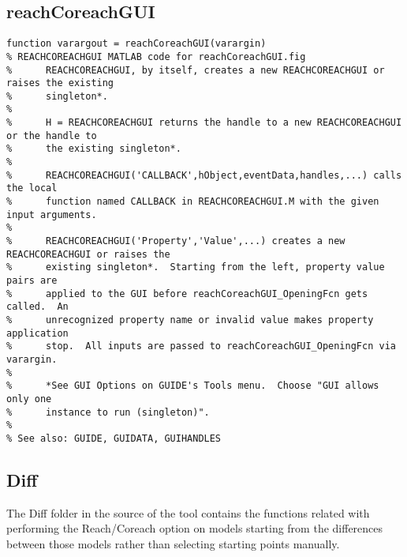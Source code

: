\documentclass[12pt,letterpaper]{report}
\begin{document}
	\subsection{reachCoreachGUI}
\begin{lstlisting}
function varargout = reachCoreachGUI(varargin)
% REACHCOREACHGUI MATLAB code for reachCoreachGUI.fig
%      REACHCOREACHGUI, by itself, creates a new REACHCOREACHGUI or raises the existing
%      singleton*.
%
%      H = REACHCOREACHGUI returns the handle to a new REACHCOREACHGUI or the handle to
%      the existing singleton*.
%
%      REACHCOREACHGUI('CALLBACK',hObject,eventData,handles,...) calls the local
%      function named CALLBACK in REACHCOREACHGUI.M with the given input arguments.
%
%      REACHCOREACHGUI('Property','Value',...) creates a new REACHCOREACHGUI or raises the
%      existing singleton*.  Starting from the left, property value pairs are
%      applied to the GUI before reachCoreachGUI_OpeningFcn gets called.  An
%      unrecognized property name or invalid value makes property application
%      stop.  All inputs are passed to reachCoreachGUI_OpeningFcn via varargin.
%
%      *See GUI Options on GUIDE's Tools menu.  Choose "GUI allows only one
%      instance to run (singleton)".
%
% See also: GUIDE, GUIDATA, GUIHANDLES
\end{lstlisting}
	
	\subsection{Diff}
		The Diff folder in the source of the tool contains the functions related with performing the Reach/Coreach option on models starting from the differences between those models rather than selecting starting points manually.
\end{document}
